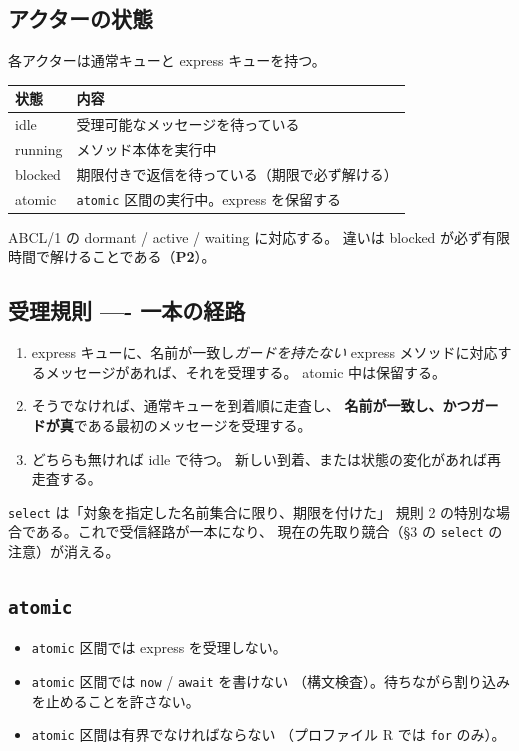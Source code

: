 \documentclass[11pt,a4paper]{ltjsarticle}
\theoremstyle{remark}
\begin{document}
\subsection{アクターの状態}

各アクターは通常キューと express キューを持つ。

\begin{center}
\small
\begin{tabular}{@{}ll@{}}
\toprule
状態 & 内容 \\
\midrule
\textsf{idle}    & 受理可能なメッセージを待っている \\
\textsf{running} & メソッド本体を実行中 \\
\textsf{blocked} & 期限付きで返信を待っている（期限で必ず解ける）\\
\textsf{atomic}  & \texttt{atomic} 区間の実行中。express を保留する \\
\bottomrule
\end{tabular}
\end{center}

ABCL/1 の dormant / active / waiting に対応する。
違いは \textsf{blocked} が必ず有限時間で解けることである（\textbf{P2}）。

\subsection{受理規則 ---- 一本の経路}

\begin{enumerate}
\item express キューに、名前が一致し\emph{ガードを持たない}
  express メソッドに対応するメッセージがあれば、それを受理する。
  \textsf{atomic} 中は保留する。
\item そうでなければ、通常キューを到着順に走査し、
  \textbf{名前が一致し、かつガードが真}である最初のメッセージを受理する。
\item どちらも無ければ \textsf{idle} で待つ。
  新しい到着、または状態の変化があれば再走査する。
\end{enumerate}

\texttt{select} は「対象を指定した名前集合に限り、期限を付けた」
規則 2 の特別な場合である。これで受信経路が一本になり、
現在の先取り競合（\S 3 の \texttt{select} の注意）が消える。

\subsection{\texttt{atomic}}

\begin{itemize}
\item \texttt{atomic} 区間では express を受理しない。
\item \texttt{atomic} 区間では \texttt{now} / \texttt{await} を書けない
  （構文検査）。待ちながら割り込みを止めることを許さない。
\item \texttt{atomic} 区間は有界でなければならない
  （プロファイル R では \texttt{for} のみ）。
\end{itemize}
\end{document}
